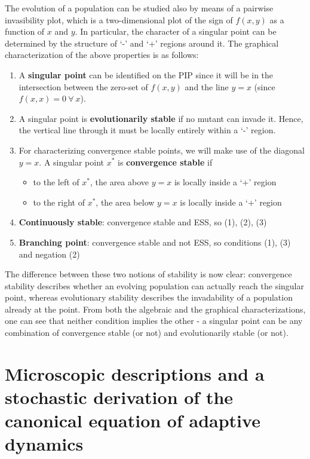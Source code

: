 The evolution of a population can be studied also by means of a pairwise invasibility plot, which is a two-dimensional plot of the sign of $f(x,y)$ as a function of $x$ and $y$. 
In particular, the character of a singular point can be determined by the structure of `-' and `+' regions around it. 
The graphical characterization of the above properties is as follows:
\begin{enumerate}
	\item A \textbf{singular point} can be identified on the PIP since it will be in the intersection between the zero-set of $f(x,y)$ and the line $y=x$ (since $f(x,x)=0 \ \forall \ x$). 
	\item A singular point is \textbf{evolutionarily stable} if no mutant can invade it. Hence, the vertical line through it must be locally entirely within a `-' region. 
	\item For characterizing convergence stable points, we will make use of the diagonal $y=x$. A singular point $x^*$ is \textbf{convergence stable} if
	\begin{itemize}
		\item to the left of $x^*$, the area above $y=x$ is locally inside a `+' region
		\item to the right of $x^*$, the area below $y=x$ is locally inside a `+' region 
	\end{itemize}   
	\item \textbf{Continuously stable}: convergence stable and ESS, so (1), (2), (3)
	\item \textbf{Branching point}: convergence stable and not ESS, so conditions (1), (3) and negation (2)
\end{enumerate}

The difference between these two notions of stability is now clear: convergence stability describes whether an evolving population can actually reach the singular point, whereas evolutionary stability describes the invadability of a population already at the point. From both the algebraic and the graphical characterizations, one can see that neither condition implies the other - a singular point can be any combination of convergence stable (or not) and evolutionarily stable (or not).  

\section{Microscopic descriptions and a stochastic derivation of the canonical equation of adaptive dynamics}
\label{section:microscopic-descriptions-CE}

